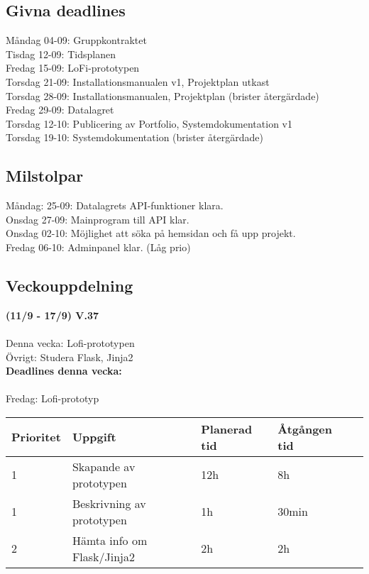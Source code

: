 \documentclass{TDP003mall}
\begin{document}
\subsection{Givna deadlines}
Måndag 04-09: Gruppkontraktet\\
Tisdag 12-09: Tidsplanen\\
Fredag 15-09: LoFi-prototypen\\
Torsdag 21-09: Installationsmanualen v1, Projektplan utkast\\
Torsdag 28-09: Installationsmanualen, Projektplan (brister återgärdade)\\
Fredag 29-09: Datalagret\\
Torsdag 12-10: Publicering av Portfolio, Systemdokumentation v1\\
Torsdag 19-10: Systemdokumentation (brister återgärdade)\\

\subsection{Milstolpar}
Måndag: 25-09: Datalagrets API-funktioner klara.\\
Onsdag 27-09: Mainprogram till API klar.\\
Onsdag 02-10: Möjlighet att söka på hemsidan och få upp projekt.\\
Fredag 06-10: Adminpanel klar. (Låg prio)\\

\subsection{Veckouppdelning}
\textbf{(11/9 - 17/9) V.37}\\\\
Denna vecka: Lofi-prototypen\\
Övrigt: Studera Flask, Jinja2\\

\textbf{Deadlines denna vecka: }\\\\
Fredag: Lofi-prototyp

\begin{table}[]
  \begin{tabular}{|l|l|l|l|l|}
  \hline
   Prioritet & Uppgift                    & Planerad tid & Åtgången tid \\ \hline
   1         & Skapande av prototypen     & 12h          & 8h           \\ \hline
   1         & Beskrivning av prototypen  & 1h           & 30min        \\ \hline
   2         & Hämta info om Flask/Jinja2 & 2h           & 2h           \\ \hline
  \end{tabular}
  \end{table}
\end{document}
